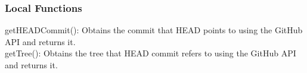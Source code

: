 \documentclass[12pt, titlepage]{article}
\begin{document}
	\subsubsection{Local Functions}
	
	\noindent getHEADCommit(): Obtains the commit that HEAD points to using the GitHub API and returns it. \\
	
	\noindent getTree(): Obtains the tree that HEAD commit refers to using the GitHub API and returns it. \\
	
	\newpage
	
	
	
	
	
	
	
	
\end{document}
